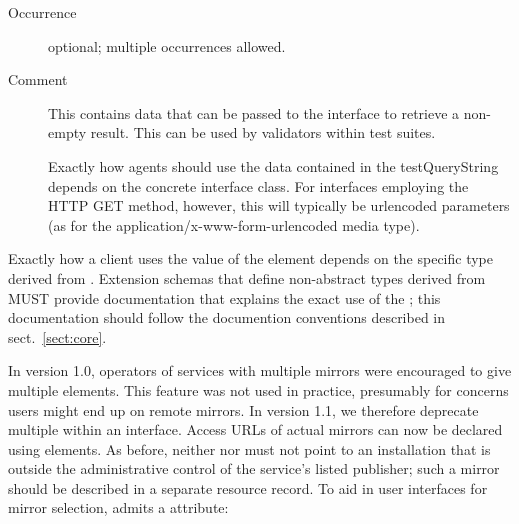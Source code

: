 \documentclass[11pt,a4paper]{ivoa}
\begin{document}
\begin{generated}
\begin{bigdescription}
\begin{description}
\item[Occurrence] optional; multiple occurrences allowed.
\item[Comment] 
                  This contains data that can be passed to the interface to
                  retrieve a non-empty result.  This can be used by validators
                  within test suites.

                  Exactly how agents should use the data contained in
                  the testQueryString depends on the concrete interface class.
                  For interfaces employing the HTTP GET method, however,
                  this will typically be urlencoded parameters (as for
                  the application/x-www-form-urlencoded media type).
               

\end{description}


\end{bigdescription}\endgroup

\endgroup
\end{generated}



Exactly how a client uses the value
of the  element depends on the specific
type derived from .  Extension schemas that
define non-abstract types derived from  MUST
provide documentation that explains the exact use of the
; this documentation should follow the
documention conventions described in sect.~\ref{sect:core}.  

In version 1.0, operators of services with multiple mirrors were
encouraged to give multiple  elements.  This feature
was not used in practice, presumably for concerns users might end up on
remote mirrors.  In version 1.1, we therefore deprecate multiple
 within an interface.  Access URLs of actual mirrors
can now be declared using  elements.
As before, neither 
 nor  must not point to an installation
that is outside the administrative control of the service's listed
publisher; such a mirror should be described in a separate resource
record.  To aid in user interfaces for mirror selection,
 admits a  attribute:
\end{document}
